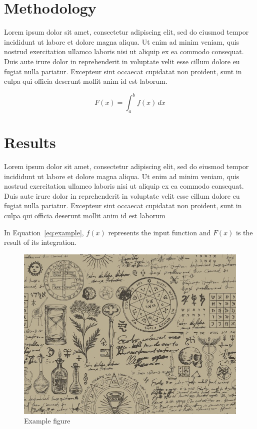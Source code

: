 \documentclass[conference]{IEEEtran}
\begin{document}
	\section{Methodology}
	Lorem ipsum dolor sit amet, consectetur adipiscing elit, sed do eiusmod tempor incididunt ut labore et dolore magna aliqua. Ut enim ad minim veniam, quis nostrud exercitation ullamco laboris nisi ut aliquip ex ea commodo consequat. Duis aute irure dolor in reprehenderit in voluptate velit esse cillum dolore eu fugiat nulla pariatur. Excepteur sint occaecat cupidatat non proident, sunt in culpa qui officia deserunt mollit anim id est laborum.
	
	\cite{russell2021human}
	
	\begin{equation}
		\label{eq:example}
		F(x) = \int_{a}^{b} f(x) \, dx
	\end{equation}
	
	\section{Results}
	Lorem ipsum dolor sit amet, consectetur adipiscing elit, sed do eiusmod tempor incididunt ut labore et dolore magna aliqua. Ut enim ad minim veniam, quis nostrud exercitation ullamco laboris nisi ut aliquip ex ea commodo consequat. Duis aute irure dolor in reprehenderit in voluptate velit esse cillum dolore eu fugiat nulla pariatur. Excepteur sint occaecat cupidatat non proident, sunt in culpa qui officia deserunt mollit anim id est laborum
		
	In Equation~\ref{eq:example}, $f(x)$ represents the input function and $F(x)$ is the result of its integration.
	\begin{figure}[htbp]
		\centering
		\includegraphics[width=0.8\columnwidth]{image}
		\caption{Example figure}
		\label{fig:example}
	\end{figure}
	
\end{document}
